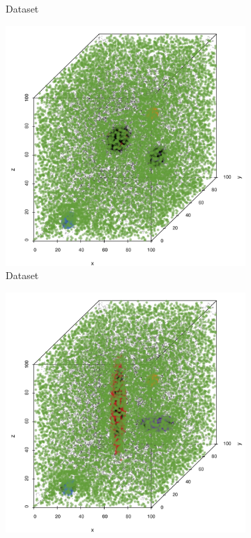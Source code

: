 \begin{figure}
\begin{subfigure}{0.23\textwidth}
					\caption{Dataset \baakmanTwo}
					\label{fig:discussion:anisotropy:baakman2}
				\end{subfigure}	
				\begin{subfigure}{0.23\textwidth}
					\centering
					\includegraphics[keepaspectratio=true, width=\textwidth, height=0.23\textheight]{discussion/img/ferdosi_3_120000_anisotropy.png}
					\caption{Dataset \ferdosiThree}
					\label{fig:discussion:anisotropy:ferdosi3}
				\end{subfigure}		
				\begin{subfigure}{0.23\textwidth}
					\centering
					\includegraphics[keepaspectratio=true, width=\textwidth, height=0.23\textheight]{discussion/img/baakman_3_60000_anisotropy.png}

\end{subfigure}
\end{figure}
